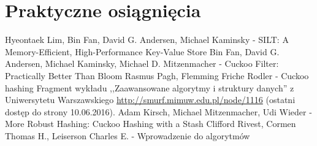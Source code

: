 \documentclass[declaration,shortabstract,masc]{iithesis}
\begin{document}
		\section{Praktyczne osiągnięcia}
	\begin{thebibliography}{3}
		 Hyeontaek Lim, Bin Fan, David G. Andersen, Michael Kaminsky - SILT: A Memory-Efficient, High-Performance Key-Value Store
		 Bin Fan, David G. Andersen, Michael Kaminsky, Michael D. Mitzenmacher - Cuckoo Filter: Practically Better Than Bloom
		 Rasmus Pagh, Flemming Friche Rodler - Cuckoo hashing
		 Fragment wykładu ,,Zaawansowane algorytmy i struktury danych'' z Uniwersytetu Warszawskiego \url{http://smurf.mimuw.edu.pl/node/1116} (ostatni dostęp do strony 10.06.2016).
		 Adam Kirsch, Michael Mitzenmacher, Udi Wieder - More Robust Hashing: Cuckoo Hashing with a Stash
		 Clifford Rivest, Cormen Thomas H., Leiserson Charles E. - Wprowadzenie do algorytmów
	\end{thebibliography}
\end{document}
